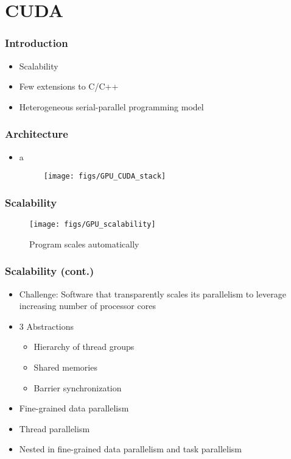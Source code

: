 \section{CUDA}
\begin{frame}\frametitle{Introduction}\logoEvolution\mypagenum
	\begin{itemize}
		\item Scalability
		\item Few extensions to C/C++
		\item Heterogeneous serial-parallel programming model
	\end{itemize}
\end{frame}


\begin{frame}\frametitle{Architecture}\logoEvolution\mypagenum
	\begin{itemize}
		\item a
		\begin{figure}
			\texttt{[image: figs/GPU\_CUDA\_stack]}
		\end{figure}
	\end{itemize}
\end{frame}


\begin{frame}\frametitle{Scalability}\logoEvolution\mypagenum
	\begin{figure}
		\texttt{[image: figs/GPU\_scalability]}
		\caption{Program scales automatically}
	\end{figure}
\end{frame}


\begin{frame}\frametitle{Scalability (cont.)}\logoEvolution\mypagenum
	\begin{itemize}
		\item Challenge: Software that transparently scales its parallelism to leverage increasing number of processor cores
		\item 3 Abstractions
		\begin{itemize}
			\item Hierarchy of thread groups
			\item Shared memories
			\item Barrier synchronization
		\end{itemize}
		\item Fine-grained data parallelism
		\item Thread parallelism
		\item Nested in fine-grained data parallelism and task parallelism
	\end{itemize}
\end{frame}




